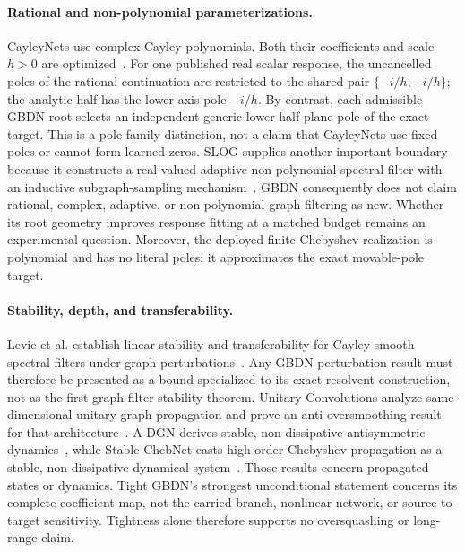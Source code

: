 \paragraph{Rational and non-polynomial parameterizations.}
CayleyNets use complex Cayley polynomials. Both their coefficients and scale $h>0$
are optimized~\cite{levie2019cayleynets}. For one published real scalar response, the
uncancelled poles of the rational continuation are restricted to the shared pair
$\{ -i/h,+i/h\}$; the analytic half has the lower-axis pole $-i/h$. By contrast, each
admissible GBDN root selects an independent generic lower-half-plane pole of the exact
target. This is a pole-family distinction, not a claim that CayleyNets use fixed poles
or cannot form learned zeros. SLOG supplies another important boundary because it
constructs a real-valued adaptive non-polynomial spectral filter with an inductive
subgraph-sampling mechanism~\cite{xu2024slog}. GBDN consequently does not claim
rational, complex, adaptive, or non-polynomial graph filtering as new. Whether its
root geometry improves response fitting at a matched budget remains an experimental
question. Moreover, the deployed finite Chebyshev realization is polynomial and has
no literal poles; it approximates the exact movable-pole target.

\paragraph{Stability, depth, and transferability.}
Levie et al. establish linear stability and transferability for Cayley-smooth
spectral filters under graph perturbations~\cite{levie2019transferability}. Any GBDN
perturbation result must therefore be presented as a bound specialized to its exact
resolvent construction, not as the first graph-filter stability theorem. Unitary
Convolutions analyze same-dimensional unitary graph propagation and prove an
anti-oversmoothing result for that architecture~\cite{kiani2024unitary}. A-DGN derives
stable, non-dissipative antisymmetric dynamics~\cite{gravina2023adgn}, while
Stable-ChebNet casts high-order Chebyshev propagation as a stable, non-dissipative
dynamical system~\cite{hariri2025stablechebnet}. Those results concern propagated
states or dynamics. Tight GBDN's strongest unconditional statement concerns its
complete coefficient map, not the carried branch, nonlinear network, or
source-to-target sensitivity. Tightness alone therefore supports no oversquashing or
long-range claim.

